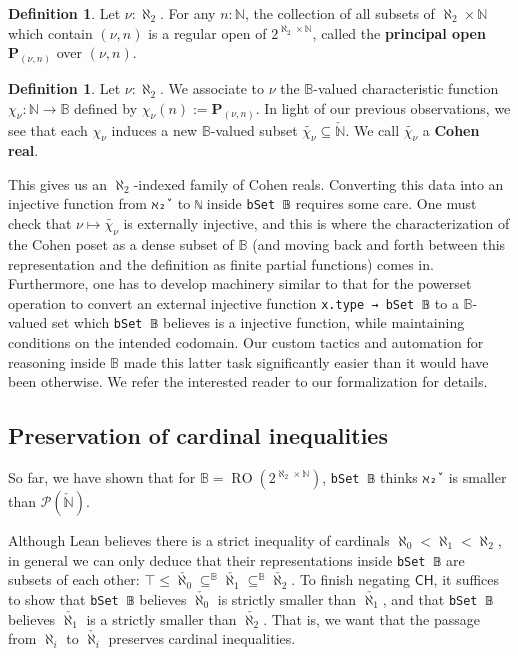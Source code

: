 \documentclass[a4paper,USenglish,cleveref, autoref]{lipics-v2019}
\newcommand{\B}{\mathbb{B}}
\newcommand{\lil}{\lstinline}
\newcommand{\N}{\mathbb{N}}
\theoremstyle{definition}
\newtheorem{defn}[theorem]{Definition}
\begin{document}
\begin{defn}
  Let $\nu : \aleph_2$. For any $n : \N$, the collection of all subsets of $\aleph_2 \times \N$ which contain $(\nu, n)$ is a regular open of $2^{\aleph_2 \times \N}$, called the \textbf{principal open} $\mathbf{P}_{(\nu, n)}$ over $(\nu, n)$.
\end{defn}

\begin{defn}
  Let $\nu : \aleph_2$. We associate to $\nu$ the $\B$-valued characteristic function $\chi_{\nu} : \N \to \B$ defined by $\chi_{\nu}(n) := \mathbf{P}_{(\nu, n)}$. In light of our previous observations, we see that each $\chi_{\nu}$ induces a new $\B$-valued subset $\widetilde{\chi_{\nu}} \subseteq \check{\N}$. We call $\widetilde{\chi_{\nu}}$ a \textbf{Cohen real}.
\end{defn}
This gives us an $\aleph_2$-indexed family of Cohen reals. Converting this data into an injective function from \lil{ℵ₂̌ } to \lil{ℕ} inside \lil{bSet 𝔹} requires some care. One must check that $\nu \mapsto \widetilde{\chi_{\nu}}$ is externally injective, and this is where the characterization of the Cohen poset as a dense subset of $\B$ (and moving back and forth between this representation and the definition as finite partial functions) comes in. Furthermore, one has to develop machinery similar to that for the powerset operation to convert an external injective function \lstinline{x.type → bSet 𝔹} to a $\B$-valued set which \lstinline{bSet 𝔹} believes is a injective function, while maintaining conditions on the intended codomain. Our custom tactics and automation for reasoning inside $\B$ made this latter task significantly easier than it would have been otherwise. We refer the interested reader to our formalization for details.

\subsection{Preservation of cardinal inequalities} \label{subsect:cardinal-inequalities}
So far, we have shown that for $\B = \operatorname{RO}(2^{\aleph_2 \times \mathbb{N}})$, \lil{bSet 𝔹} thinks \lstinline{ℵ₂̌ } is smaller than $\mathcal{P}(\check{\mathbb{N}})$.

Although Lean believes there is a strict inequality of cardinals $\aleph_0 < \aleph_1 < \aleph_2$, in general we can only deduce that their representations inside \lil{bSet 𝔹} are subsets of each other: $\top \leq \check{\aleph_0} \subseteq^\B \check{\aleph_1} \subseteq^\B \check{\aleph_2}$. To finish negating $\mathsf{CH}$, it suffices to show that \lstinline{bSet 𝔹} believes $\check{\aleph_0}$ is strictly smaller than $\check{\aleph_1}$, and that \lstinline{bSet 𝔹} believes $\check{\aleph_1}$ is a strictly smaller than $\check{\aleph_2}$. That is, we want that the passage from $\aleph_i$ to $\check{\aleph_i}$ preserves cardinal inequalities.
\end{document}
